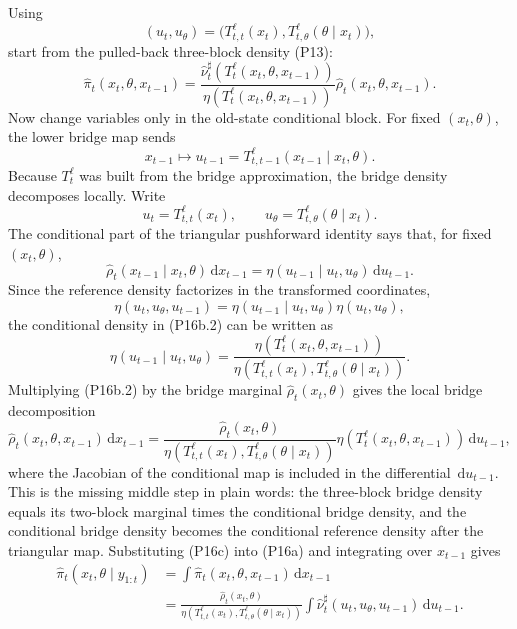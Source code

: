 \documentclass[11pt]{article}
\newcommand{\dd}{\,\mathrm d}
\begin{document}
Using
\[
    (u_t,u_\theta)
    =
    \bigl(
    T_{t,t}^{\ell}(x_t),
    T_{t,\theta}^{\ell}(\theta\mid x_t)
    \bigr),
    \tag{P16}
\]
start from the pulled-back three-block density (P13):
\[
    \widehat\pi_t(x_t,\theta,x_{t-1})
    =
    \frac{
    \widehat\nu_t^\sharp(T_t^\ell(x_t,\theta,x_{t-1}))}
    {\eta(T_t^\ell(x_t,\theta,x_{t-1}))}
    \widehat\rho_t(x_t,\theta,x_{t-1}).
    \tag{P16a}
\]
Now change variables only in the old-state conditional block.  For fixed
\((x_t,\theta)\), the lower bridge map sends
\[
    x_{t-1}
    \mapsto
    u_{t-1}
    =
    T_{t,t-1}^{\ell}(x_{t-1}\mid x_t,\theta).
    \tag{P16b}
\]
Because \(T_t^\ell\) was built from the bridge approximation, the bridge
density decomposes locally.  Write
\[
    u_t=T_{t,t}^{\ell}(x_t),\qquad
    u_\theta=T_{t,\theta}^{\ell}(\theta\mid x_t).
    \tag{P16b.1}
\]
The conditional part of the triangular pushforward identity says that, for
fixed \((x_t,\theta)\),
\[
    \widehat\rho_t(x_{t-1}\mid x_t,\theta)\dd x_{t-1}
    =
    \eta(u_{t-1}\mid u_t,u_\theta)\dd u_{t-1}.
    \tag{P16b.2}
\]
Since the reference density factorizes in the transformed coordinates,
\[
    \eta(u_t,u_\theta,u_{t-1})
    =
    \eta(u_{t-1}\mid u_t,u_\theta)\eta(u_t,u_\theta),
    \tag{P16b.3}
\]
the conditional density in (P16b.2) can be written as
\[
    \eta(u_{t-1}\mid u_t,u_\theta)
    =
    \frac{\eta(T_t^\ell(x_t,\theta,x_{t-1}))}
    {\eta(T_{t,t}^{\ell}(x_t),T_{t,\theta}^{\ell}(\theta\mid x_t))}.
    \tag{P16b.4}
\]
Multiplying (P16b.2) by the bridge marginal
\(\widehat\rho_t(x_t,\theta)\) gives the local bridge decomposition
\[
    \widehat\rho_t(x_t,\theta,x_{t-1})\dd x_{t-1}
    =
    \frac{
    \widehat\rho_t(x_t,\theta)}
    {\eta(T_{t,t}^{\ell}(x_t),T_{t,\theta}^{\ell}(\theta\mid x_t))}
    \eta(T_t^\ell(x_t,\theta,x_{t-1}))\dd u_{t-1},
    \tag{P16c}
\]
where the Jacobian of the conditional map is included in the differential
\(\dd u_{t-1}\).  This is the missing middle step in plain words: the
three-block bridge density equals its two-block marginal times the conditional
bridge density, and the conditional bridge density becomes the conditional
reference density after the triangular map.  Substituting (P16c) into (P16a)
and integrating over
\(x_{t-1}\) gives
\[
\begin{aligned}
 \widehat\pi_t(x_t,\theta\mid y_{1:t})
 &=
 \int \widehat\pi_t(x_t,\theta,x_{t-1})\dd x_{t-1}\\
 &=
 \frac{\widehat\rho_t(x_t,\theta)}
 {\eta(T_{t,t}^{\ell}(x_t),T_{t,\theta}^{\ell}(\theta\mid x_t))}
 \int \widehat\nu_t^\sharp(u_t,u_\theta,u_{t-1})\dd u_{t-1}.
\end{aligned}
    \tag{P16d}
\]
\end{document}
